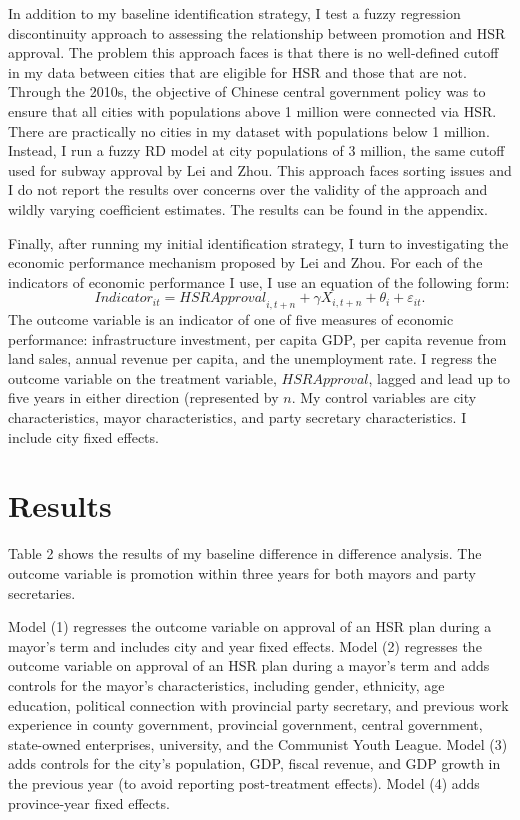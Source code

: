\documentclass[12pt, ]{article}
\begin{document}
In addition to my baseline identification strategy, I test a fuzzy
regression discontinuity approach to assessing the relationship between
promotion and HSR approval. The problem this approach faces is that
there is no well-defined cutoff in my data between cities that are
eligible for HSR and those that are not. Through the 2010s, the
objective of Chinese central government policy was to ensure that all
cities with populations above 1 million were connected via HSR. There
are practically no cities in my dataset with populations below 1
million. Instead, I run a fuzzy RD model at city populations of 3
million, the same cutoff used for subway approval by Lei and Zhou. This
approach faces sorting issues and I do not report the results over
concerns over the validity of the approach and wildly varying
coefficient estimates. The results can be found in the appendix.

Finally, after running my initial identification strategy, I turn to
investigating the economic performance mechanism proposed by Lei and
Zhou. For each of the indicators of economic performance I use, I use an
equation of the following form:
\[Indicator_{it} = {HSR Approval}_{i, t + n} + \gamma X_{i,t + n} + \theta_{i} + \varepsilon_{it}.\]
The outcome variable is an indicator of one of five measures of economic
performance: infrastructure investment, per capita GDP, per capita
revenue from land sales, annual revenue per capita, and the unemployment
rate. I regress the outcome variable on the treatment variable,
\(HSR Approval\), lagged and lead up to five years in either direction
(represented by \(n\). My control variables are city characteristics,
mayor characteristics, and party secretary characteristics. I include
city fixed effects.

\hypertarget{results}{%
\section{Results}\label{results}}

Table 2 shows the results of my baseline difference in difference
analysis. The outcome variable is promotion within three years for both
mayors and party secretaries.

Model (1) regresses the outcome variable on approval of an HSR plan
during a mayor's term and includes city and year fixed effects. Model
(2) regresses the outcome variable on approval of an HSR plan during a
mayor's term and adds controls for the mayor's characteristics,
including gender, ethnicity, age education, political connection with
provincial party secretary, and previous work experience in county
government, provincial government, central government, state-owned
enterprises, university, and the Communist Youth League. Model (3) adds
controls for the city's population, GDP, fiscal revenue, and GDP growth
in the previous year (to avoid reporting post-treatment effects). Model
(4) adds province-year fixed effects.
\end{document}
